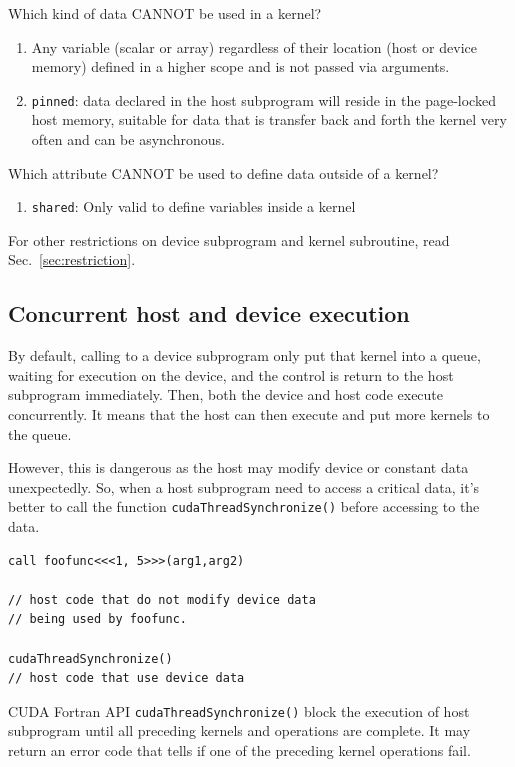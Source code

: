 Which kind of data CANNOT be used in a kernel?
\begin{enumerate}
\item Any variable (scalar or array) regardless of their location
  (host or device memory) defined in a higher scope and is not passed
  via arguments.

\item \verb!pinned!: data declared in the host subprogram will reside
  in the page-locked host memory, suitable for data that is transfer
  back and forth the kernel very often and can be asynchronous.

\end{enumerate}

Which attribute CANNOT be used to define data outside of a kernel?
\begin{enumerate}
\item \verb!shared!: Only valid to define variables inside a kernel
\end{enumerate}

For other restrictions on device subprogram and kernel subroutine, read
Sec.~\ref{sec:restriction}.

\subsection{Concurrent host and device execution}
\label{sec:conc-host-device}

By default, calling to a device subprogram only put that kernel into a
queue, waiting for execution on the device, and the control is return
to the host subprogram immediately. Then, both the device and host
code execute concurrently. It means that the host can then execute and
put more kernels to the queue. 

However, this is dangerous as the host may modify device or constant
data unexpectedly. So, when a host subprogram need to access a
critical data, it's better to call the function
\verb.cudaThreadSynchronize(). before accessing to the data.

\begin{lstlisting}
call foofunc<<<1, 5>>>(arg1,arg2)

// host code that do not modify device data
// being used by foofunc.

cudaThreadSynchronize()
// host code that use device data
\end{lstlisting}

CUDA Fortran API \verb.cudaThreadSynchronize(). block the execution of
host subprogram until all preceding kernels and operations are
complete. It may return an error code that tells if one of the
preceding kernel operations fail. 

